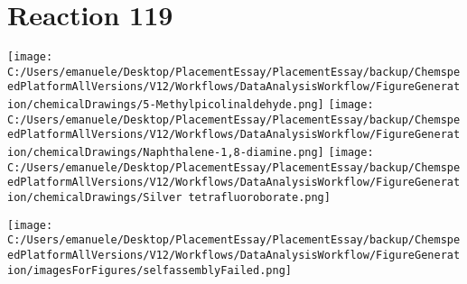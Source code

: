 \documentclass{article}%
\begin{document}
\section*{Reaction 119}%
%
\begin{scheme}[H]%
\begin{minipage}{0.5\textwidth}%
\texttt{[image: C:/Users/emanuele/Desktop/PlacementEssay/PlacementEssay/backup/ChemspeedPlatformAllVersions/V12/Workflows/DataAnalysisWorkflow/FigureGeneration/chemicalDrawings/5-Methylpicolinaldehyde.png]}%
\texttt{[image: C:/Users/emanuele/Desktop/PlacementEssay/PlacementEssay/backup/ChemspeedPlatformAllVersions/V12/Workflows/DataAnalysisWorkflow/FigureGeneration/chemicalDrawings/Naphthalene-1,8-diamine.png]}%
\texttt{[image: C:/Users/emanuele/Desktop/PlacementEssay/PlacementEssay/backup/ChemspeedPlatformAllVersions/V12/Workflows/DataAnalysisWorkflow/FigureGeneration/chemicalDrawings/Silver tetrafluoroborate.png]}%
\end{minipage}%
\begin{minipage}{0.5\textwidth}%
\begin{center}%
\texttt{[image: C:/Users/emanuele/Desktop/PlacementEssay/PlacementEssay/backup/ChemspeedPlatformAllVersions/V12/Workflows/DataAnalysisWorkflow/FigureGeneration/imagesForFigures/selfassemblyFailed.png]}%
\end{center}%
\end{minipage}%
\caption{Self-assembly of components 3, 21, with Silver(I) in a 3.0:1.5:1.0 molar ratio in CH$_3$CN at 60\textdegree C for 40h. These are the reagents (starting materials) for reaction 119.}%
\end{scheme}%
\end{document}
